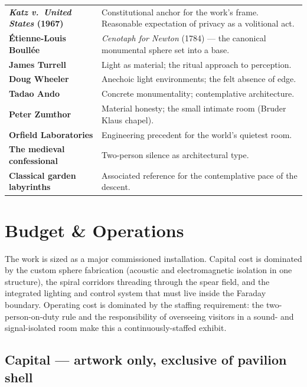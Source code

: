 \documentclass[]{anvil-installation}
\begin{document}
\begin{metricbox}
\begin{tabularx}{\textwidth}{@{} >{\bfseries}p{3.6cm} X @{}}
\textit{Katz v.\ United States} (1967) & Constitutional anchor for the work's frame. Reasonable expectation of privacy as a volitional act. \\
Étienne-Louis Boullée & \textit{Cenotaph for Newton} (1784) --- the canonical monumental sphere set into a base. \\
James Turrell & Light as material; the ritual approach to perception. \\
Doug Wheeler & Anechoic light environments; the felt absence of edge. \\
Tadao Ando & Concrete monumentality; contemplative architecture. \\
Peter Zumthor & Material honesty; the small intimate room (Bruder Klaus chapel). \\
Orfield Laboratories & Engineering precedent for the world's quietest room. \\
The medieval confessional & Two-person silence as architectural type. \\
Classical garden labyrinths & Associated reference for the contemplative pace of the descent. \\
\end{tabularx}
\end{metricbox}

\section{Budget \& Operations}

The work is sized as a major commissioned installation. Capital cost is dominated by the custom sphere fabrication (acoustic and electromagnetic isolation in one structure), the spiral corridors threading through the spear field, and the integrated lighting and control system that must live inside the Faraday boundary. Operating cost is dominated by the staffing requirement: the two-person-on-duty rule and the responsibility of overseeing visitors in a sound- and signal-isolated room make this a continuously-staffed exhibit.

\subsection{Capital --- artwork only, exclusive of pavilion shell}
\end{document}
